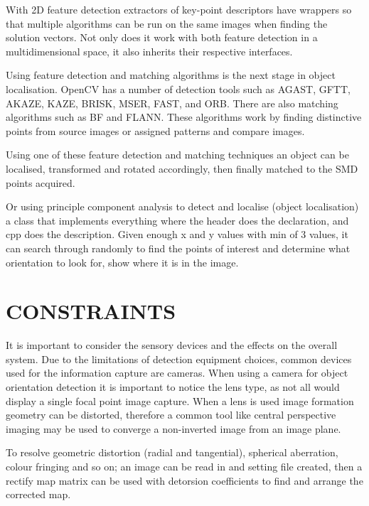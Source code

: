 \documentclass[a4paper, 10pt]{IEEEconf}
\begin{document}
With 2D feature detection extractors of key-point descriptors have wrappers so that multiple algorithms can be run on the same images when finding the solution vectors. Not only does it work with both feature detection in a multidimensional space, it also inherits their respective interfaces.

Using feature detection and matching algorithms is the next stage in object localisation. OpenCV has a number of detection tools such as AGAST, GFTT, AKAZE, KAZE, BRISK, MSER, FAST, and ORB. There are also matching algorithms such as BF and FLANN. These algorithms work by finding distinctive points from source images or assigned patterns and compare images.

Using one of these feature detection and matching techniques an object can be localised, transformed and rotated accordingly, then finally matched to the SMD points acquired.

Or using principle component analysis to detect and localise (object localisation) a class that implements everything where the header does the declaration, and cpp does the description. Given enough x and y values with min of 3 values, it can search through randomly to find the points of interest and determine what orientation to look for, show where it is in the image.

\clearpage
\section{CONSTRAINTS} 
It is important to consider the sensory devices and the effects on the overall system. Due to the limitations of detection equipment choices, common devices used for the information capture are cameras. When using a camera for object orientation detection it is important to notice the lens type, as not all would display a single focal point image capture. When a lens is used image formation geometry can be distorted, therefore a common tool like central perspective imaging may be used to converge a non-inverted image from an image plane. 

To resolve geometric distortion (radial and tangential), spherical aberration, colour fringing and so on; an image can be read in and setting file created, then a rectify map matrix can be used with detorsion coefficients to find and arrange the corrected map.
\end{document}
